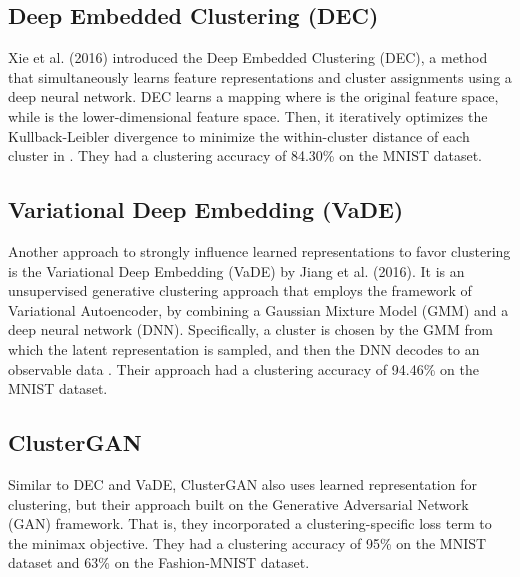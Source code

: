 \documentclass[conference]{IEEEtran}
\begin{document}
\subsection{Deep Embedded Clustering (DEC)}
Xie et al. (2016)\cite{xie2016unsupervised} introduced the Deep Embedded Clustering (DEC), a method that simultaneously learns feature representations and cluster assignments using a deep neural network. DEC learns a mapping  where  is the original feature space, while  is the lower-dimensional feature space. Then, it iteratively optimizes the Kullback-Leibler divergence to minimize the within-cluster distance of each cluster in . They had a clustering accuracy of 84.30\% on the MNIST dataset\cite{lecun1998gradient}.

\subsection{Variational Deep Embedding (VaDE)}
Another approach to strongly influence learned representations to favor clustering is the Variational Deep Embedding (VaDE) by Jiang et al. (2016)\cite{jiang2016variational}. It is an unsupervised generative clustering approach that employs the framework of Variational Autoencoder\cite{kingma2013autoencoding}, by combining a Gaussian Mixture Model (GMM) and a deep neural network (DNN). Specifically, a cluster is chosen by the GMM from which the latent representation  is sampled, and then the DNN decodes  to an observable data . Their approach had a clustering accuracy of 94.46\% on the MNIST dataset\cite{lecun1998gradient}.

\subsection{ClusterGAN}
Similar to DEC\cite{xie2016unsupervised} and VaDE\cite{jiang2016variational}, ClusterGAN\cite{mukherjee2019clustergan} also uses learned representation for clustering, but their approach built on the Generative Adversarial Network (GAN)\cite{goodfellow2014generative} framework. That is, they incorporated a clustering-specific loss term to the minimax objective. They had a clustering accuracy of 95\% on the MNIST dataset\cite{lecun1998gradient} and 63\% on the Fashion-MNIST dataset\cite{xiao2017fashion}.
\end{document}
